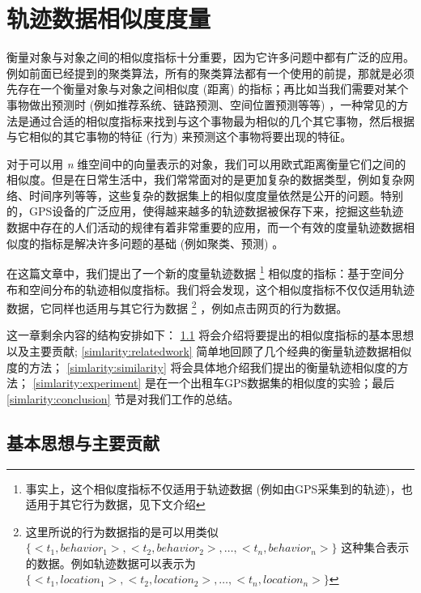 

\newcommand{\Reference}[1]{{\textcolor{red}{{} #1}}}
\chapter{轨迹数据相似度度量} 
\label{chp:Similarity}
衡量对象与对象之间的相似度指标十分重要，因为它许多问题中都有广泛的应用。例如前面已经提到的聚类算法，所有的聚类算法都有一个使用的前提，那就是必须先存在一个衡量对象与对象之间相似度 (距离) 的指标；再比如当我们需要对某个事物做出预测时 (例如推荐系统、链路预测、空间位置预测等等) ，一种常见的方法是通过合适的相似度指标来找到与这个事物最为相似的几个其它事物，然后根据与它相似的其它事物的特征 (行为) 来预测这个事物将要出现的特征。 \par
对于可以用 \emph{n} 维空间中的向量表示的对象，我们可以用欧式距离衡量它们之间的相似度。但是在日常生活中，我们常常面对的是更加复杂的数据类型，例如复杂网络、时间序列等等，这些复杂的数据集上的相似度度量依然是公开的问题。特别的，GPS设备的广泛应用，使得越来越多的轨迹数据被保存下来，挖掘这些轨迹数据中存在的人们活动的规律有着非常重要的应用，而一个有效的度量轨迹数据相似度的指标是解决许多问题的基础 (例如聚类、预测) 。\par
在这篇文章中，我们提出了一个新的度量轨迹数据 \footnote{事实上，这个相似度指标不仅适用于轨迹数据 (例如由GPS采集到的轨迹)，也适用于其它行为数据，见下文介绍} 相似度的指标：基于空间分布和空间分布的轨迹相似度指标。我们将会发现，这个相似度指标不仅仅适用轨迹数据，它同样也适用与其它行为数据 \footnote{这里所说的行为数据指的是可以用类似 $\{<t_1,behavior_1>,<t_2,behavior_2>,\ldots,<t_n,behavior_n>\}$ 这种集合表示的数据。例如轨迹数据可以表示为 $\{<t_1,location_1>,<t_2,location_2>,\ldots,<t_n,location_n>\}$ } ，例如点击网页的行为数据。\par
这一章剩余内容的结构安排如下： \ref{simlarity:basicidea} 将会介绍将要提出的相似度指标的基本思想以及主要贡献; \ref{simlarity:relatedwork} 简单地回顾了几个经典的衡量轨迹数据相似度的方法； \ref{simlarity:similarity} 将会具体地介绍我们提出的衡量轨迹相似度的方法； \ref{simlarity:experiment} 是在一个出租车GPS数据集的相似度的实验；最后 \ref{simlarity:conclusion} 节是对我们工作的总结。 

\section{基本思想与主要贡献}
\label{simlarity:basicidea}
